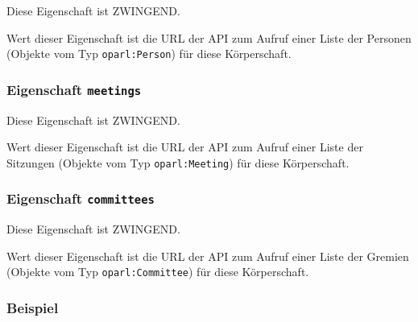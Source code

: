 \documentclass[,a4paper]{article}
\begin{document}
Diese Eigenschaft ist ZWINGEND.

Wert dieser Eigenschaft ist die URL der API zum Aufruf einer Liste der
Personen (Objekte vom Typ \texttt{oparl:Person}) für diese Körperschaft.

\subsubsection{Eigenschaft \texttt{meetings}}

Diese Eigenschaft ist ZWINGEND.

Wert dieser Eigenschaft ist die URL der API zum Aufruf einer Liste der
Sitzungen (Objekte vom Typ \texttt{oparl:Meeting}) für diese
Körperschaft.

\subsubsection{Eigenschaft \texttt{committees}}

Diese Eigenschaft ist ZWINGEND.

Wert dieser Eigenschaft ist die URL der API zum Aufruf einer Liste der
Gremien (Objekte vom Typ \texttt{oparl:Committee}) für diese
Körperschaft.

\subsubsection{Beispiel}
\end{document}
